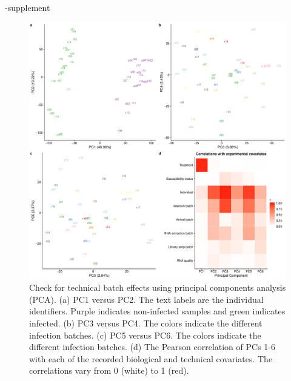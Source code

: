 \documentclass[fleqn,10pt]{wlscirep}
\begin{document}
\begin{filecontents}{\jobname-supplement}
\begin{figure}[ht]
\centering
\includegraphics[width=\linewidth]{../figure/batch-pca.pdf}
\caption{
Check for technical batch effects using principal components analysis
(PCA). (a) PC1 versus PC2. The text labels are the individual
identifiers. Purple indicates non-infected samples and green indicates
infected. (b) PC3 versus PC4. The colors indicate the different
infection batches. (c) PC5 versus PC6. The colors indicate the
different infection batches. (d) The Pearson correlation of PCs 1-6
with each of the recorded biological and technical covariates. The
correlations vary from 0 (white) to 1 (red).
}
\label{fig:batch}
\end{figure}


\end{filecontents}
\end{document}
